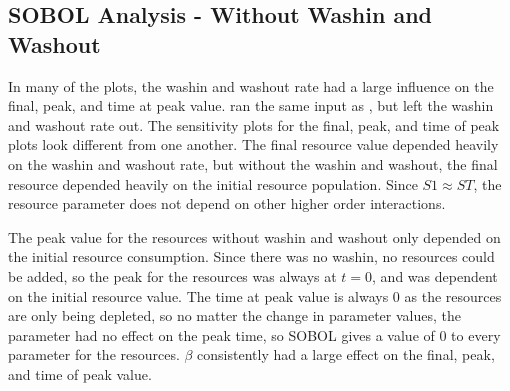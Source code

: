 \subsection{SOBOL Analysis - Without Washin and Washout}
In many of the plots, the washin and washout rate had a large influence on the final, peak, and time at peak value. 
 ran the same input as , but left the washin and washout rate out. 
The sensitivity plots for the final, peak, and time of peak plots look different from one another. 
The final resource value depended heavily on the washin and washout rate, but without the washin and washout, the final resource depended heavily on the initial resource population. 
Since $S1 \approx ST$, the resource parameter does not depend on other higher order interactions. 

The peak value for the resources without washin and washout only depended on the initial resource consumption. 
Since there was no washin, no resources could be added, so the peak for the resources was always at $t=0$, and was dependent on the initial resource value. 
The time at peak value is always 0 as the resources are only being depleted, so no matter the change in parameter values, the parameter had no effect on the peak time, so SOBOL gives a value of 0 to every parameter for the resources. 
$\beta$ consistently had a large effect on the final, peak, and time of peak value. 





